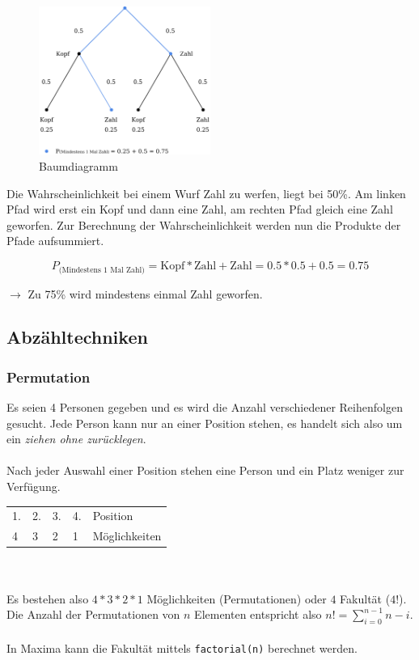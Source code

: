 \documentclass{school}
\begin{document}
\begin{figure}[h]
	\centering
	\includegraphics[width=0.5\textwidth]{tree.png}
	\caption{Baumdiagramm}
\end{figure}

Die Wahrscheinlichkeit bei einem Wurf Zahl zu werfen, liegt bei 50\%. Am linken Pfad wird erst ein Kopf und dann eine Zahl, am rechten Pfad gleich eine Zahl geworfen. Zur Berechnung der Wahrscheinlichkeit werden nun die Produkte der Pfade aufsummiert.

$$P_{\text{(Mindestens 1 Mal Zahl)}} = \text{Kopf} * \text{Zahl} + \text{Zahl} = 0.5 * 0.5 + 0.5 = 0.75$$
\begin{center}
$\to$ Zu 75\% wird mindestens einmal Zahl geworfen.
\end{center}

\newpage
\subsection{Abzähltechniken}
\subsubsection{Permutation}
Es seien 4 Personen gegeben und es wird die Anzahl verschiedener Reihenfolgen gesucht. Jede Person kann nur an einer Position stehen, es handelt sich also um ein \textit{ziehen ohne zurücklegen}.
\\\\
Nach jeder Auswahl einer Position stehen eine Person und ein Platz weniger zur Verfügung.

{\small \begin{tabular}{l l l l l}
1. & 2. & 3. & 4. & Position\\
4 & 3 & 2 & 1 & Möglichkeiten
\end{tabular}}
\\\\
Es bestehen also $4 * 3 * 2 * 1$ Möglichkeiten (Permutationen) oder $4$ Fakultät ($4!$).\\
Die Anzahl der Permutationen von $n$ Elementen entspricht also $n! = \sum_{i=0}^{n - 1} n-i$.
\\\\
In Maxima kann die Fakultät mittels \verb|factorial(n)| berechnet werden.
\end{document}
